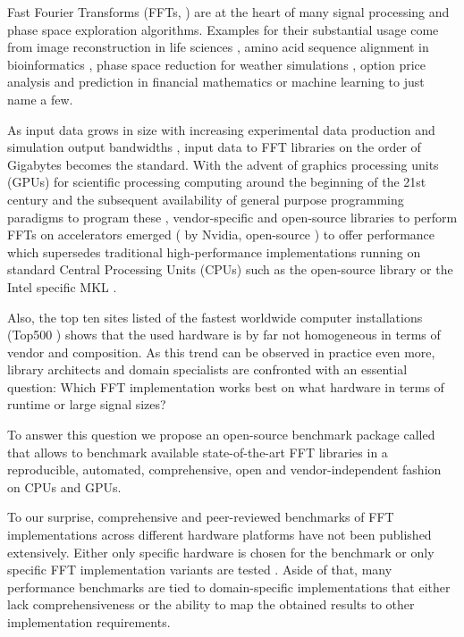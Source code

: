 Fast Fourier Transforms (FFTs, \citep{van1992computational}) are at the heart of many signal processing and phase space exploration algorithms. Examples for their substantial usage come from image reconstruction in life sciences \citep{preibisch2014efficient,schmid2015real}, amino acid sequence alignment in bioinformatics \citep{katoh2002mafft}, phase space reduction for weather simulations \citep{maronga2015parallelized}, option price analysis and prediction in financial mathematics \citep{hurd2010fourier} or machine learning \citep{dlstudy} to just name a few.

As input data grows in size with increasing experimental data production \citep{huisken2004optical} and simulation output bandwidths \citep{maronga2015parallelized}, input data to FFT libraries on the order of Gigabytes becomes the standard. With the advent of graphics processing units (GPUs) for scientific processing computing around the beginning of the 21st century and the subsequent availability of general purpose programming paradigms to program these \citep{du2012cuda}, vendor-specific and open-source libraries to perform FFTs on accelerators emerged (\cufft{} \citep{nvidia2010cufft} by Nvidia, open-source \clfft{} \citep{clfft}) to offer performance which supersedes traditional high-performance implementations running on standard Central Processing Units (CPUs) such as the open-source \fftw{} library \citep{FFTW05} or the Intel specific MKL \citep{intel2007intel}.

Also, the top ten sites listed of the fastest worldwide computer installations (Top500 \citep{meuer2011top500}) shows that the used hardware is by far not homogeneous in terms of vendor and composition. As this trend can be observed in practice even more, library architects and domain specialists are confronted with an essential question: Which FFT implementation works best on what hardware in terms of runtime or large signal sizes?  

To answer this question we propose an open-source benchmark package called \gearshifft{} \citep{gearshifft_github} that allows to benchmark available state-of-the-art FFT libraries in a reproducible, automated, comprehensive, open and vendor-independent fashion on CPUs and GPUs.

To our surprise, comprehensive and peer-reviewed benchmarks of FFT implementations across different hardware platforms have not been published extensively. Either only specific hardware is chosen for the benchmark \citep{park2015fast,eleftheriou2005performance,Akin:15} or only specific FFT implementation variants are tested \citep{shoc2010,dongarra2013hpc}. Aside of that, many performance benchmarks are tied to domain-specific implementations \citep{fialka2006fft} that either lack comprehensiveness or the ability to map the obtained results to other implementation requirements.

